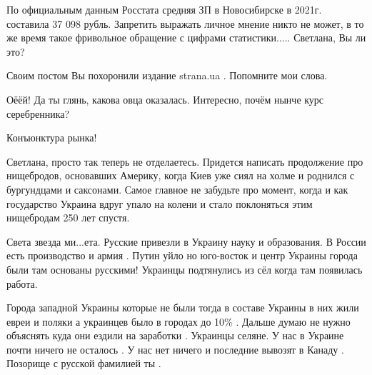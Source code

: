 \begin{itemize}
По официальным данным Росстата средняя ЗП в Новосибирске в 2021г. составила 37 098 рубль. Запретить выражать личное мнение никто не может, в то же время такое фривольное обращение с цифрами статистики..... Светлана, Вы ли это?

 
Своим постом Вы похоронили издание strana.ua . Попомните мои слова.

 
Оёёй! Да ты глянь, какова овца оказалась. Интересно, почём нынче курс серебренника?

 
Конъюнктура рынка!

 
Светлана, просто так теперь не отделаетесь. Придется написать продолжение про
нищебродов, основавших Америку, когда Киев уже сиял на холме и роднился с
бургундцами и саксонами. Самое главное не забудьте про момент, когда и как
государство Украина вдруг упало на колени и стало поклоняться этим нищебродам
250 лет спустя.

 

Света звезда ми...ета. Русские привезли в Украину науку и образования. В России
есть производство и армия . Путин уйло но юго-восток и центр Украины города
были там основаны русскими! Украинцы подтянулись из сёл когда там появилась
работа. 

Города западной Украины которые не были тогда в составе Украины в них жили
евреи и поляки а украинцев было в городах до 10\% . Дальше думаю не нужно
объяснять куда они ездили на заработки . Украинцы селяне. У нас в Украине почти
ничего не осталось . У нас нет ничего и последние вывозят в Канаду . Позорище с
русской фамилией ты . 


\end{itemize}
